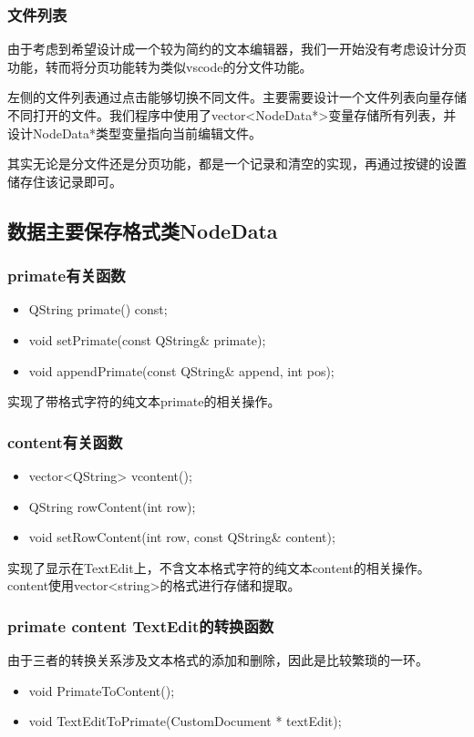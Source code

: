 \documentclass{./source/Report}
\begin{document}
\subsubsection{文件列表}
由于考虑到希望设计成一个较为简约的文本编辑器，我们一开始没有考虑设计分页功能，转而将分页功能转为类似vscode的分文件功能。\par
左侧的文件列表通过点击能够切换不同文件。主要需要设计一个文件列表向量存储不同打开的文件。我们程序中使用了vector<NodeData*>变量存储所有列表，并设计NodeData*类型变量指向当前编辑文件。\par
其实无论是分文件还是分页功能，都是一个记录和清空的实现，再通过按键的设置储存住该记录即可。

\subsection{数据主要保存格式类NodeData}
\subsubsection{primate有关函数}
\begin{itemize}
    \item QString primate() const;
    \item void setPrimate(const QString\& primate);
    \item void appendPrimate(const QString\& append, int pos);
\end{itemize}\par
实现了带格式字符的纯文本primate的相关操作。\par
\subsubsection{content有关函数}
\begin{itemize}
    \item vector<QString> vcontent();
    \item QString rowContent(int row);
    \item void setRowContent(int row, const QString\& content);
\end{itemize}\par
实现了显示在TextEdit上，不含文本格式字符的纯文本content的相关操作。content使用vector<string>的格式进行存储和提取。
\subsubsection{primate content TextEdit的转换函数}
由于三者的转换关系涉及文本格式的添加和删除，因此是比较繁琐的一环。
\begin{itemize}
    \item void PrimateToContent();
    \item void TextEditToPrimate(CustomDocument * textEdit);
\end{itemize}\par
\end{document}
